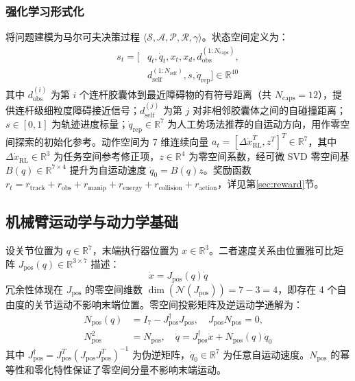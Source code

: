 \documentclass[10pt,conference]{IEEEtran}
\begin{document}
\subsubsection{强化学习形式化}
将问题建模为马尔可夫决策过程 $\langle \mathcal{S}, \mathcal{A}, \mathcal{P}, \mathcal{R}, \gamma \rangle$。状态空间定义为：
\begin{equation}
\begin{aligned}
s_t = [&q_t, \dot{q}_t, x_t, x_d, d_{\text{obs}}^{(1:N_{\text{caps}})}, \\
&d_{\text{self}}^{(1:N_{\text{self}})}, s, \dot{q}_{\text{rep}}] \in \mathbb{R}^{40}
\end{aligned}
\end{equation}
其中 $d_{\text{obs}}^{(i)}$ 为第 $i$ 个连杆胶囊体到最近障碍物的有符号距离（共 $N_{\text{caps}}=12$），提供连杆级细粒度障碍接近信号；$d_{\text{self}}^{(j)}$ 为第 $j$ 对非相邻胶囊体之间的自碰撞距离；$s \in [0,1]$ 为轨迹进度标量；$\dot{q}_{\text{rep}} \in \mathbb{R}^7$ 为人工势场法推荐的自运动方向，用作零空间探索的初始化参考。动作空间为 7 维连续向量 $a_t = [\Delta \dot{x}_{\text{RL}}^T, z^T]^T \in \mathbb{R}^{7}$，其中 $\Delta \dot{x}_{\text{RL}} \in \mathbb{R}^3$ 为任务空间参考修正项，$z \in \mathbb{R}^{4}$ 为零空间系数，经可微 SVD 零空间基 $B(q) \in \mathbb{R}^{7 \times 4}$ 提升为自运动速度 $\dot{q}_0 = B(q)z$。奖励函数 $r_t = r_{\text{track}} + r_{\text{obs}} + r_{\text{manip}} + r_{\text{energy}} + r_{\text{collision}} + r_{\text{action}}$，详见第\ref{sec:reward}节。

\subsection{机械臂运动学与动力学基础}
\label{sec:preliminaries}

设关节位置为 $q \in \mathbb{R}^7$，末端执行器位置为 $x \in \mathbb{R}^3$。二者速度关系由位置雅可比矩阵 $J_{\text{pos}}(q) \in \mathbb{R}^{3 \times 7}$ 描述：
\begin{equation}
\dot{x} = J_{\text{pos}}(q)\dot{q}
\label{eq:forward_kinematics}
\end{equation}
冗余性体现在 $J_{\text{pos}}$ 的零空间维数 $\dim(\mathcal{N}(J_{\text{pos}})) = 7 - 3 = 4$，即存在 4 个自由度的关节运动不影响末端位置。零空间投影矩阵及逆运动学通解为：
\begin{equation}
\begin{aligned}
N_{\text{pos}}(q) &= I_7 - J_{\text{pos}}^\dagger J_{\text{pos}}, \quad J_{\text{pos}}N_{\text{pos}} = 0, \\
N_{\text{pos}}^2 &= N_{\text{pos}}, \quad \dot{q} = J_{\text{pos}}^\dagger \dot{x} + N_{\text{pos}}(q)\dot{q}_0
\end{aligned}
\label{eq:nullspace}
\end{equation}
其中 $J_{\text{pos}}^\dagger = J_{\text{pos}}^T(J_{\text{pos}}J_{\text{pos}}^T)^{-1}$ 为伪逆矩阵，$\dot{q}_0 \in \mathbb{R}^7$ 为任意自运动速度。$N_{\text{pos}}$ 的幂等性和零化特性保证了零空间分量不影响末端运动。
\end{document}
